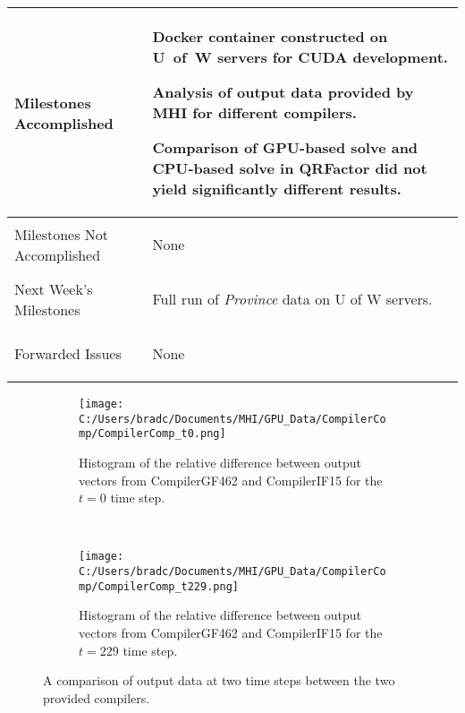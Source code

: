 \documentclass[11pt,letterpaper]{article}
\newcommand{\its}{\item[\tiny\textbullet]}
\begin{document}
\begin{tabular}{| p{} | p{} |}
	Milestones \newline Accomplished & \begin{enumerate*}
	\item[\tiny\textbullet] Docker container constructed on U~of~W servers for CUDA development. \newline
  \its Analysis of output data provided by MHI for different compilers. \newline
  \its Comparison of GPU-based solve and CPU-based solve in QRFactor did not yield significantly different results. 
  \end{enumerate*} \\ \hline

	Milestones Not \newline Accomplished & \begin{enumerate*}
	\item[\tiny\textbullet] None
	\end{enumerate*} \\ \hline

	Next Week's \newline Milestones & \begin{enumerate*}
  \item[\tiny\textbullet] Full run of \emph{Province} data on U of W servers.
	\end{enumerate*} \\ \hline

	Forwarded Issues & \begin{enumerate*}
	\item[\tiny\textbullet] None
	\end{enumerate*} \\ \hline
\end{tabular}

\begin{figure}[!ht]
    \centering
    \begin{subfigure}{0.45\textwidth}
        \texttt{[image: C:/Users/bradc/Documents/MHI/GPU\_Data/CompilerComp/CompilerComp\_t0.png]}
        \caption{Histogram of the relative difference between output vectors from CompilerGF462 and
        CompilerIF15 for the $t=0$ time step.}
        \label{f:compdiff_t0}
    \end{subfigure}
    \,
    \begin{subfigure}{0.45\textwidth}
        \texttt{[image: C:/Users/bradc/Documents/MHI/GPU\_Data/CompilerComp/CompilerComp\_t229.png]}
        \caption{Histogram of the relative difference between output vectors from CompilerGF462 and
        CompilerIF15 for the $t=229$ time step.}
        \label{f:compdiff_t229}
    \end{subfigure}
    \caption{A comparison of output data at two time steps between the two provided compilers.}
    \label{f:compdiffs}
\end{figure}
\end{document}
